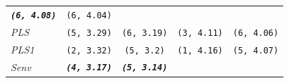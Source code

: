 \documentclass[12pt,A4paper,authoryear]{elsarticle} %
\theoremstyle{definition}
\theoremstyle{definition}
\theoremstyle{remark}
\begin{document}
\begin{longtable}[]{@{}lcccc@{}}
\begin{minipage}[t]{0.19\columnwidth}
\textbf{\emph{\texttt{(6,\ 4.08)}}}\strut
\end{minipage} & \begin{minipage}[t]{0.19\columnwidth}\centering\strut
\texttt{(6,\ 4.04)}\strut
\end{minipage}\tabularnewline
\begin{minipage}[t]{0.09\columnwidth}\raggedright\strut
\emph{PLS}\strut
\end{minipage} & \begin{minipage}[t]{0.19\columnwidth}\centering\strut
\texttt{(5,\ 3.29)}\strut
\end{minipage} & \begin{minipage}[t]{0.19\columnwidth}\centering\strut
\texttt{(6,\ 3.19)}\strut
\end{minipage} & \begin{minipage}[t]{0.19\columnwidth}\centering\strut
\texttt{(3,\ 4.11)}\strut
\end{minipage} & \begin{minipage}[t]{0.19\columnwidth}\centering\strut
\texttt{(6,\ 4.06)}\strut
\end{minipage}\tabularnewline
\begin{minipage}[t]{0.09\columnwidth}\raggedright\strut
\emph{PLS1}\strut
\end{minipage} & \begin{minipage}[t]{0.19\columnwidth}\centering\strut
\texttt{(2,\ 3.32)}\strut
\end{minipage} & \begin{minipage}[t]{0.19\columnwidth}\centering\strut
\texttt{(5,\ 3.2)}\strut
\end{minipage} & \begin{minipage}[t]{0.19\columnwidth}\centering\strut
\texttt{(1,\ 4.16)}\strut
\end{minipage} & \begin{minipage}[t]{0.19\columnwidth}\centering\strut
\texttt{(5,\ 4.07)}\strut
\end{minipage}\tabularnewline
\begin{minipage}[t]{0.09\columnwidth}\raggedright\strut
\emph{Senv}\strut
\end{minipage} & \begin{minipage}[t]{0.19\columnwidth}\centering\strut
\textbf{\emph{\texttt{(4,\ 3.17)}}}\strut
\end{minipage} & \begin{minipage}[t]{0.19\columnwidth}\centering\strut
\textbf{\emph{\texttt{(5,\ 3.14)}}}\strut
\end{minipage} & \begin{minipage}[t]{0.19\columnwidth}\centering\strut

\end{minipage}
\end{longtable}
\end{document}
